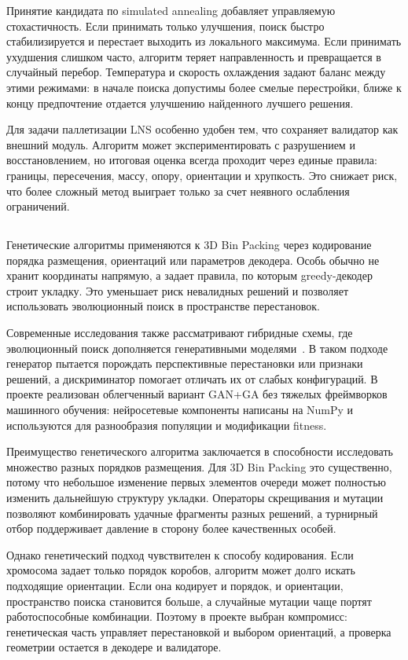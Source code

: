 Принятие кандидата по simulated annealing добавляет управляемую стохастичность. Если принимать только улучшения, поиск быстро стабилизируется и перестает выходить из локального максимума. Если принимать ухудшения слишком часто, алгоритм теряет направленность и превращается в случайный перебор. Температура и скорость охлаждения задают баланс между этими режимами: в начале поиска допустимы более смелые перестройки, ближе к концу предпочтение отдается улучшению найденного лучшего решения.

Для задачи паллетизации LNS особенно удобен тем, что сохраняет валидатор как внешний модуль. Алгоритм может экспериментировать с разрушением и восстановлением, но итоговая оценка всегда проходит через единые правила: границы, пересечения, массу, опору, ориентации и хрупкость. Это снижает риск, что более сложный метод выиграет только за счет неявного ослабления ограничений.

\subsection{}

Генетические алгоритмы применяются к 3D Bin Packing через кодирование порядка размещения, ориентаций или параметров декодера. Особь обычно не хранит координаты напрямую, а задает правила, по которым greedy-декодер строит укладку. Это уменьшает риск невалидных решений и позволяет использовать эволюционный поиск в пространстве перестановок.

Современные исследования также рассматривают гибридные схемы, где эволюционный поиск дополняется генеративными моделями~\cite{zhang2024}. В таком подходе генератор пытается порождать перспективные перестановки или признаки решений, а дискриминатор помогает отличать их от слабых конфигураций. В проекте реализован облегченный вариант GAN+GA без тяжелых фреймворков машинного обучения: нейросетевые компоненты написаны на NumPy и используются для разнообразия популяции и модификации fitness.

Преимущество генетического алгоритма заключается в способности исследовать множество разных порядков размещения. Для 3D Bin Packing это существенно, потому что небольшое изменение первых элементов очереди может полностью изменить дальнейшую структуру укладки. Операторы скрещивания и мутации позволяют комбинировать удачные фрагменты разных решений, а турнирный отбор поддерживает давление в сторону более качественных особей.

Однако генетический подход чувствителен к способу кодирования. Если хромосома задает только порядок коробов, алгоритм может долго искать подходящие ориентации. Если она кодирует и порядок, и ориентации, пространство поиска становится больше, а случайные мутации чаще портят работоспособные комбинации. Поэтому в проекте выбран компромисс: генетическая часть управляет перестановкой и выбором ориентаций, а проверка геометрии остается в декодере и валидаторе.

